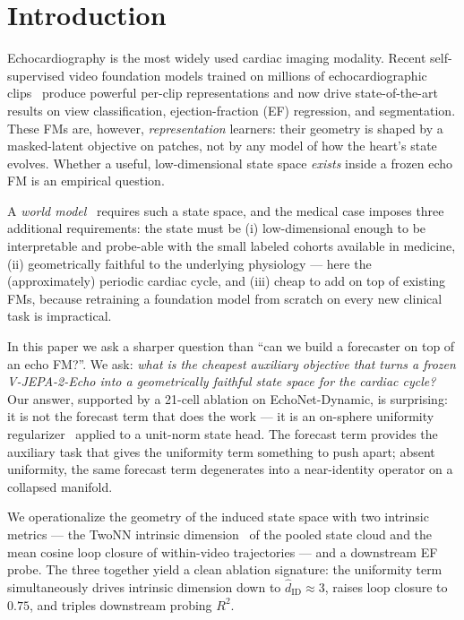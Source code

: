 \documentclass[runningheads]{llncs}
\begin{document}
\section{Introduction}\label{sec:intro}

Echocardiography is the most widely used cardiac imaging modality. Recent
self-supervised video foundation models trained on millions of
echocardiographic clips~\cite{vjepa2,echonet} produce powerful per-clip
representations and now drive state-of-the-art results on view
classification, ejection-fraction (EF) regression, and segmentation.
These FMs are, however, \emph{representation} learners: their geometry is
shaped by a masked-latent objective on patches, not by any model of how
the heart's state evolves. Whether a useful, low-dimensional state space
\emph{exists} inside a frozen echo FM is an empirical question.

A \emph{world model}~\cite{ha2018world,hafner2019dreamer,vjepa2} requires
such a state space, and the medical case imposes three additional
requirements: the state must be (i) low-dimensional enough to be
interpretable and probe-able with the small labeled cohorts available
in medicine, (ii) geometrically faithful to the underlying physiology
--- here the (approximately) periodic cardiac cycle, and (iii) cheap to
add on top of existing FMs, because retraining a foundation model from
scratch on every new clinical task is impractical.

In this paper we ask a sharper question than ``can we build a forecaster
on top of an echo FM?''. We ask: \emph{what is the cheapest auxiliary
objective that turns a frozen V-JEPA-2-Echo into a geometrically faithful
state space for the cardiac cycle?} Our answer, supported by a 21-cell
ablation on EchoNet-Dynamic, is surprising: it is not the forecast term
that does the work --- it is an on-sphere uniformity
regularizer~\cite{wang2020uniformity} applied to a unit-norm state head.
The forecast term provides the auxiliary task that gives the uniformity
term something to push apart; absent uniformity, the same forecast term
degenerates into a near-identity operator on a collapsed manifold.

We operationalize the geometry of the induced state space with two
intrinsic metrics --- the TwoNN intrinsic dimension~\cite{facco2017twonn}
of the pooled state cloud and the mean cosine loop closure of within-video
trajectories --- and a downstream EF probe. The three together yield a
clean ablation signature: the uniformity term simultaneously drives
intrinsic dimension down to $\widehat{d}_\mathrm{ID}\!\approx\!3$, raises
loop closure to $0.75$, and triples downstream probing $R^2$.
\end{document}
